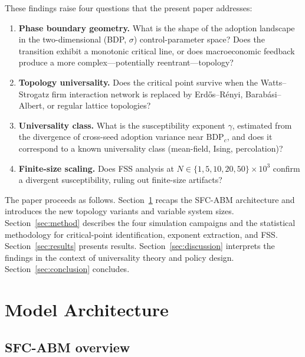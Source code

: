 \documentclass[12pt,a4paper]{article}
\begin{document}
These findings raise four questions that the present paper addresses:

\begin{enumerate}
    \item \textbf{Phase boundary geometry.} What is the shape of the adoption
    landscape in the two-dimensional (BDP, $\sigma$) control-parameter
    space? Does the transition exhibit a monotonic critical line, or does
    macroeconomic feedback produce a more complex---potentially
    reentrant---topology?

    \item \textbf{Topology universality.} Does the critical point survive when
    the Watts--Strogatz firm interaction network is replaced by
    Erd\H{o}s--R\'{e}nyi, Barab\'{a}si--Albert, or regular lattice topologies?

    \item \textbf{Universality class.} What is the susceptibility exponent
    $\gamma$, estimated from the divergence of cross-seed adoption variance
    near $\mathrm{BDP}_c$, and does it correspond to a known universality
    class (mean-field, Ising, percolation)?

    \item \textbf{Finite-size scaling.} Does FSS analysis at
    $N \in \{1, 5, 10, 20, 50\} \times 10^3$ confirm a divergent
    susceptibility, ruling out finite-size artifacts?
\end{enumerate}

The paper proceeds as follows. Section~\ref{sec:model} recaps the SFC-ABM
architecture and introduces the new topology variants and variable system
sizes. Section~\ref{sec:method} describes the four simulation campaigns and the
statistical methodology for critical-point identification, exponent extraction,
and FSS. Section~\ref{sec:results} presents results.
Section~\ref{sec:discussion} interprets the findings in the context of
universality theory and policy design. Section~\ref{sec:conclusion} concludes.

\section{Model Architecture}
\label{sec:model}

\subsection{SFC-ABM overview}
\end{document}
